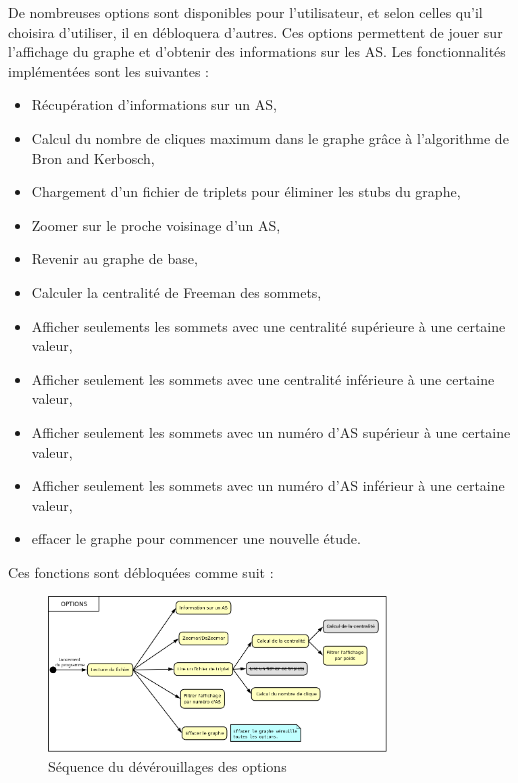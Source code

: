 \par
De nombreuses options sont disponibles pour l'utilisateur, et selon celles qu'il choisira d'utiliser, il en d\'ebloquera d'autres. Ces options permettent de jouer sur l'affichage du graphe et d'obtenir des informations sur les AS. Les fonctionnalit\'es impl\'ement\'ees sont les suivantes :
\begin{itemize}
 \item R\'ecup\'eration d'informations sur un AS,
 \item Calcul du nombre de cliques maximum dans le graphe gr\^ace \`a l'algorithme de Bron and Kerbosch,
 \item Chargement d'un fichier de triplets pour \'eliminer les stubs du graphe,
 \item Zoomer sur le proche voisinage d'un AS,
 \item Revenir au graphe de base,
 \item Calculer la centralit\'e de Freeman des sommets,
 \item Afficher seulements les sommets avec une centralit\'e sup\'erieure \`a une certaine valeur,
 \item Afficher seulement les sommets avec une centralit\'e inf\'erieure \`a une certaine valeur,
 \item Afficher seulement les sommets avec un num\'ero d'AS sup\'erieur \`a une certaine valeur,
 \item Afficher seulement les sommets avec un num\'ero d'AS inf\'erieur \`a une certaine valeur,
 \item effacer le graphe pour commencer une nouvelle \'etude.
\end{itemize}

Ces fonctions sont d\'ebloqu\'ees comme suit :

\begin{figure}[H]
\centering
 \includegraphics[width=0.8\textwidth]{./schema/seqMenu.png}
  \caption{\label{seq_option}S\'equence du d\'ev\'erouillages des options}
\end{figure}


